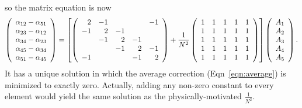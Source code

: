 \documentclass[12pt]{article}
\begin{document}
so the matrix equation is now
\begin{equation}
\left(\begin{array}{c}
\alpha_{12} - \alpha_{51} \\
\alpha_{23} - \alpha_{12} \\
\alpha_{34} - \alpha_{23} \\
\alpha_{45} - \alpha_{34} \\
\alpha_{51} - \alpha_{45}
\end{array} \right)
=
\left[\left(\begin{array}{r r r r r}
2 & -1 &  &  & -1 \\
-1 & 2 & -1 &  &  \\
 & -1 & 2 & -1 &  \\
 &  & -1 & 2 & -1 \\
-1 &  &  & -1 & 2
\end{array}\right)
+
\frac{1}{N^2}
\left(\begin{array}{r r r r r}
1 & 1 & 1 & 1 & 1 \\
1 & 1 & 1 & 1 & 1 \\
1 & 1 & 1 & 1 & 1 \\
1 & 1 & 1 & 1 & 1 \\
1 & 1 & 1 & 1 & 1
\end{array}\right)
\right]
\left(\begin{array}{c}
A_1 \\
A_2 \\
A_3 \\
A_4 \\
A_5 \\
\end{array} \right)\mbox{.}
\label{eqn:solution}
\end{equation}
It has a unique solution in which the average correction
(Eqn~\ref{eqn:average}) is minimized to exactly zero.  Actually, adding
any non-zero constant to every element would yield the same solution as
the physically-motivated $\frac{1}{N^2}$.
\end{document}
